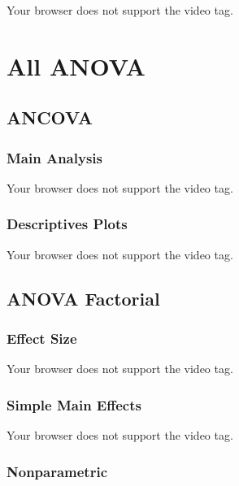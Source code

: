 \documentclass[
  letterpaper,
  DIV=11,
  numbers=noendperiod]{scrreprt}
\begin{document}
Your browser does not support the video tag.


\hypertarget{all-anova}{%
\chapter{All ANOVA}\label{all-anova}}

\hypertarget{ancova}{%
\section{ANCOVA}\label{ancova}}

\hypertarget{main-analysis-1}{%
\subsection{Main Analysis}\label{main-analysis-1}}

Your browser does not support the video tag.

\hypertarget{descriptives-plots}{%
\subsection{Descriptives Plots}\label{descriptives-plots}}

Your browser does not support the video tag.

\hypertarget{anova-factorial}{%
\section{ANOVA Factorial}\label{anova-factorial}}

\hypertarget{effect-size-1}{%
\subsection{Effect Size}\label{effect-size-1}}

Your browser does not support the video tag.

\hypertarget{simple-main-effects}{%
\subsection{Simple Main Effects}\label{simple-main-effects}}

Your browser does not support the video tag.

\hypertarget{nonparametric}{%
\subsection{Nonparametric}\label{nonparametric}}
\end{document}
